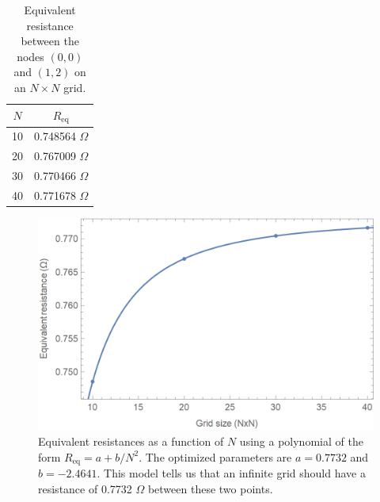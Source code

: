 \documentclass{article}
\begin{document}
\bigskip
{}
\medskip

\begin{table}[H]
    \centering
    \begin{tabular}{c|c}
        $N$ & $R_\text{eq}$ \\
        \hline 
        10 & 0.748564 $\Omega$ \\
        20 & 0.767009 $\Omega$ \\
        30 & 0.770466 $\Omega$ \\
        40 & 0.771678 $\Omega$
    \end{tabular}
    \caption{Equivalent resistance between the nodes $(0,0)$ and $(1,2)$ on an $N\times N$ grid.}
    \label{tab:knightsjump}
\end{table}

\begin{figure}[H]
    \centering
    \includegraphics{homework5/3a.png}
    \caption{Equivalent resistances as a function of $N$ using a polynomial of the form $R_\text{eq}=a+b/N^2$. The optimized parameters are $a=0.7732$ and $b=-2.4641$. This model tells us that an infinite grid should have a resistance of 0.7732 $\Omega$ between these two points.}
    \label{fig:n2fit}
\end{figure}
\end{document}
